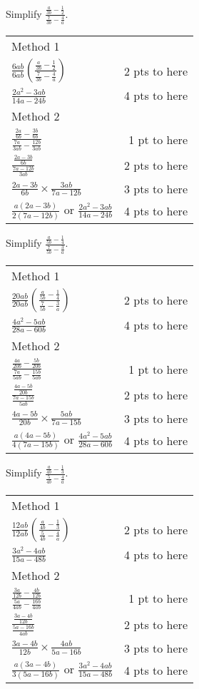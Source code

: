 {
	Simplify $\displaystyle \frac{\frac{a}{3b}-\frac{1}{2}}{\frac{7}{3b}-\frac{4}{a}}$.
}
{
	\begin{tabular}{l r}
	Method 1 \\
	$\frac{6ab}{6ab}(\frac{\frac{a}{3b}-\frac{1}{2}}{\frac{7}{3b}-\frac{4}{a}})$& 2 pts to here\\
	$\frac{2a^2-3ab}{14a-24b}$ & 4 pts to here\\
	Method 2\\
	$\frac{\frac{2a}{6b}-\frac{3b}{6b}}{\frac{7a}{3ab}-\frac{12b}{3ab}}$ & 1 pt to here\\
	$\frac{\frac{2a-3b}{6b}}{\frac{7a-12b}{3ab}}$ & 2 pts to here\\
	$\frac{2a-3b}{6b} \times \frac{3ab}{7a-12b}$ & 3 pts to here\\
	$\frac{a(2a-3b)}{2(7a-12b)}$ or $\frac{2a^2-3ab}{14a-24b}$ & 4 pts to here
	\end{tabular}
}

{
	Simplify $\displaystyle \frac{\frac{a}{5b}-\frac{1}{4}}{\frac{7}{5b}-\frac{3}{a}}$.
}
{
	\begin{tabular}{l r}
	Method 1 \\
	$\frac{20ab}{20ab}(\frac{\frac{a}{5b}-\frac{1}{4}}{\frac{7}{5b}-\frac{3}{a}})$& 2 pts to here\\
	$\frac{4a^2-5ab}{28a-60b}$ & 4 pts to here\\
	Method 2 \\
	$\frac{\frac{4a}{20b}-\frac{5b}{20b}}{\frac{7a}{5ab}-\frac{15b}{5ab}}$ & 1 pt to here\\
	$\frac{\frac{4a-5b}{20b}}{\frac{7a-15b}{5ab}}$ & 2 pts to here\\
	$\frac{4a-5b}{20b} \times \frac{5ab}{7a-15b}$ & 3 pts to here\\
	$\frac{a(4a-5b)}{4(7a-15b)}$  or $\frac{4a^2-5ab}{28a-60b}$ & 4 pts to here
	\end{tabular}
}

{
	Simplify $\displaystyle \frac{\frac{a}{4b}-\frac{1}{3}}{\frac{5}{4b}-\frac{4}{a}}$.
}
{
	\begin{tabular}{l r}
	Method 1 \\
	$\frac{12ab}{12ab}(\frac{\frac{a}{4b}-\frac{1}{3}}{\frac{5}{4b}-\frac{4}{a}})$& 2 pts to here\\
	$\frac{3a^2-4ab}{15a-48b}$ & 4 pts to here\\
	Method 2 \\
	$\frac{\frac{3a}{12b}-\frac{4b}{12b}}{\frac{5a}{4ab}-\frac{16b}{4ab}}$ & 1 pt to here\\
	$\frac{\frac{3a-4b}{12b}}{\frac{5a-16b}{4ab}}$ & 2 pts to here\\
	$\frac{3a-4b}{12b} \times \frac{4ab}{5a-16b}$ & 3 pts to here\\
	$\frac{a(3a-4b)}{3(5a-16b)}$  or $\frac{3a^2-4ab}{15a-48b}$ & 4 pts to here
	\end{tabular}
}

